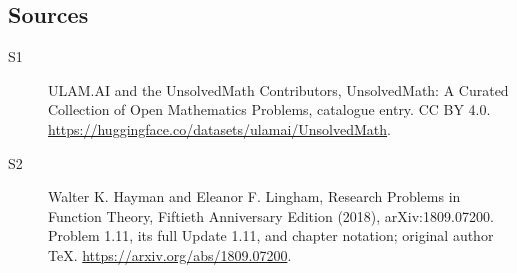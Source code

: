 \documentclass[11pt]{article}
\begin{document}
\subsection{Sources}
\begin{description}
\item[\hypertarget{source:statement:1}{S1}] ULAM.AI and the UnsolvedMath Contributors, UnsolvedMath: A Curated Collection of Open Mathematics Problems, catalogue entry. CC BY 4.0. \url{https://huggingface.co/datasets/ulamai/UnsolvedMath}.
\item[\hypertarget{source:statement:2}{S2}] Walter K. Hayman and Eleanor F. Lingham, Research Problems in Function Theory, Fiftieth Anniversary Edition (2018), arXiv:1809.07200. Problem 1.11, its full Update 1.11, and chapter notation; original author TeX. \url{https://arxiv.org/abs/1809.07200}.
\end{description}
\label{end:statement}
\end{document}
